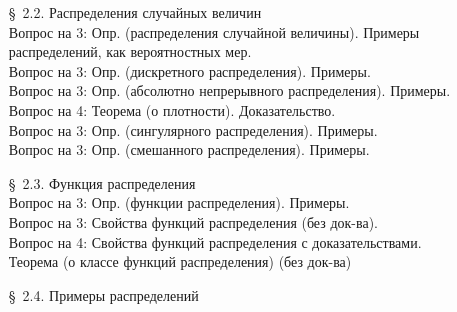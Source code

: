 \documentclass[10pt]{amsart}
\begin{document}
\begin{enumerate}
\begin{enumerate}
    
\item[\S\, 2.2.] Распределения случайных величин \\
Вопрос на 3: Опр. (распределения случайной величины). Примеры распределений, как вероятностных мер. \\
Вопрос на 3: Опр. (дискретного распределения). Примеры. \\
Вопрос на 3: Опр. (абсолютно непрерывного распределения). Примеры. \\
Вопрос на 4: Теорема (о плотности). Доказательство. \\
Вопрос на 3: Опр. (сингулярного распределения). Примеры. \\
Вопрос на 3: Опр. (смешанного распределения). Примеры. \\


\item[\S\, 2.3.] Функция распределения \\
    
Вопрос на 3: Опр. (функции распределения). Примеры. \\
Вопрос на 3: Свойства функций распределения (без док-ва). \\
Вопрос на 4: Свойства функций распределения с доказательствами. \\
Теорема (о классе функций распределения) (без док-ва)\\


\item[\S\, 2.4.] Примеры распределений \\
    

\end{enumerate}
\end{enumerate}
\end{document}
